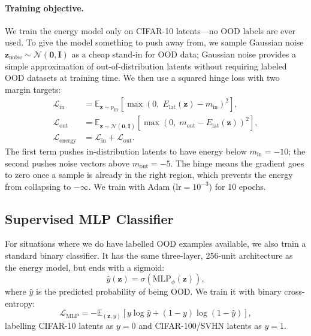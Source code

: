 \documentclass[10pt,twocolumn,letterpaper]{article}
\begin{document}
\paragraph{Training objective.}
We train the energy model only on CIFAR-10 latents---no OOD labels are
ever used. To give the model something to push away from, we sample
Gaussian noise $\mathbf{z}_{\mathrm{noise}} \sim \mathcal{N}(\mathbf{0},\mathbf{I})$
as a cheap stand-in for OOD data; Gaussian noise provides a simple
approximation of out-of-distribution latents without requiring
labeled OOD datasets at training time. We then use a squared hinge loss with
two margin targets:
\begin{align}
  \mathcal{L}_{\mathrm{in}}
    &= \mathbb{E}_{\mathbf{z}\sim p_{\mathrm{ID}}}\!
       \left[\max\!\left(0,\;E_{\mathrm{lat}}(\mathbf{z}) - m_{\mathrm{in}}\right)^2\right],
  \label{eq:lin} \\[4pt]
  \mathcal{L}_{\mathrm{out}}
    &= \mathbb{E}_{\mathbf{z}\sim\mathcal{N}(\mathbf{0},\mathbf{I})}\!
       \left[\max\!\left(0,\;m_{\mathrm{out}} - E_{\mathrm{lat}}(\mathbf{z})\right)^2\right],
  \label{eq:lout} \\[4pt]
  \mathcal{L}_{\mathrm{energy}}
    &= \mathcal{L}_{\mathrm{in}} + \mathcal{L}_{\mathrm{out}}.
  \label{eq:lenergy}
\end{align}
The first term pushes in-distribution latents to have energy below
$m_{\mathrm{in}} = -10$; the second pushes noise vectors above
$m_{\mathrm{out}} = -5$. The hinge means the gradient goes to zero once
a sample is already in the right region, which prevents the energy from
collapsing to $-\infty$. We train with Adam ($\text{lr} = 10^{-3}$) for
10 epochs.

\subsection{Supervised MLP Classifier}

For situations where we do have labelled OOD examples available, we also
train a standard binary classifier. It has the same three-layer, 256-unit
architecture as the energy model, but ends with a sigmoid:
\begin{equation}
  \hat{y}(\mathbf{z}) = \sigma\!\left(\mathrm{MLP}_\phi(\mathbf{z})\right),
  \label{eq:mlp}
\end{equation}
where $\hat{y}$ is the predicted probability of being OOD. We train it
with binary cross-entropy:
\begin{equation}
  \mathcal{L}_{\mathrm{MLP}} =
    -\mathbb{E}_{(\mathbf{z},y)}\!\left[
      y\log\hat{y} + (1-y)\log(1-\hat{y})
    \right],
  \label{eq:bce}
\end{equation}
labelling CIFAR-10 latents as $y=0$ and CIFAR-100/SVHN latents as $y=1$.
\end{document}
